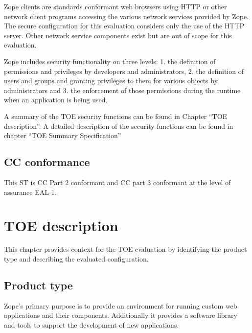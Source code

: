 \documentclass[12pt,english]{scrbook}
\begin{document}
Zope clients are standards conformant web browsers using HTTP or other network
client programs accessing the various network services provided by Zope. The
secure configuration for this evaluation considers only the use of the HTTP
server. Other network service components exist but are out of scope for this
evaluation.

Zope includes security functionality on three levels: 1. the definition of
permissions and privileges by developers and administrators, 2. the definition
of users and groups and granting privileges to them for various objects by
administrators and 3. the enforcement of those permissions during the runtime
when an application is being used.

A summary of the TOE security functions can be found in Chapter ``TOE
description''. A detailed description of the security functions can be found in
chapter ``TOE Summary Specification''


\section{CC conformance}

This ST is CC Part 2 conformant and CC part 3 conformant at the level of
assurance EAL 1.





\chapter{TOE description}

This chapter provides context for the TOE evaluation by identifying the product
type and describing the evaluated configuration.



\section{Product type}

Zope's primary purpose is to provide an environment for running custom web
applications and their components. Additionally it provides a software library
and tools to support the development of new applications.
\end{document}

